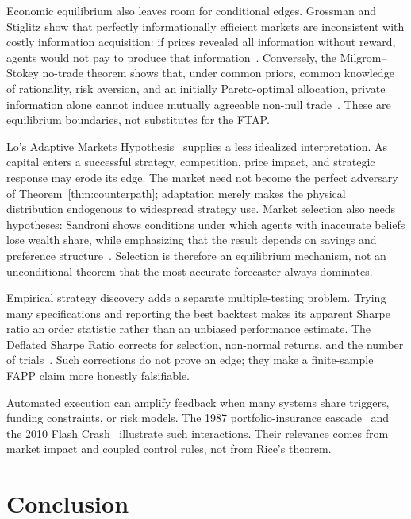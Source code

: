 \documentclass[aps,pra,reprint,superscriptaddress,amsmath,amssymb,floatfix]{revtex4-2}
\theoremstyle{plain}
\theoremstyle{definition}
\theoremstyle{remark}
\begin{document}
Economic equilibrium also leaves room for conditional edges. Grossman and
Stiglitz show that perfectly informationally efficient markets are
inconsistent with costly information acquisition: if prices revealed all
information without reward, agents would not pay to produce that
information~\cite{GrossmanStiglitz1980}. Conversely, the Milgrom--Stokey
no-trade theorem shows that, under common priors, common knowledge of
rationality, risk aversion, and an initially Pareto-optimal allocation, private
information alone cannot induce mutually agreeable non-null
trade~\cite{MilgromStokey1982}. These are equilibrium boundaries, not
substitutes for the FTAP.

Lo's Adaptive Markets Hypothesis~\cite{Lo2004} supplies a less idealized
interpretation. As capital enters a successful strategy, competition, price
impact, and strategic response may erode its edge. The market need not become
the perfect adversary of Theorem~\ref{thm:counterpath}; adaptation merely makes
the physical distribution endogenous to widespread strategy use. Market
selection also needs hypotheses: Sandroni shows conditions under which agents
with inaccurate beliefs lose wealth share, while emphasizing that the result
depends on savings and preference structure~\cite{Sandroni2000}. Selection is
therefore an equilibrium mechanism, not an unconditional theorem that the most
accurate forecaster always dominates.

Empirical strategy discovery adds a separate multiple-testing problem. Trying
many specifications and reporting the best backtest makes its apparent Sharpe
ratio an order statistic rather than an unbiased performance estimate. The
Deflated Sharpe Ratio corrects for selection, non-normal returns, and the
number of trials~\cite{BaileyLopez2014}. Such corrections do not prove an edge;
they make a finite-sample FAPP claim more honestly falsifiable.

Automated execution can amplify feedback when many systems share triggers,
funding constraints, or risk models. The 1987 portfolio-insurance
cascade~\cite{Brady1988} and the 2010 Flash Crash~\cite{Kirilenko2017} illustrate
such interactions. Their relevance comes from market impact and coupled
control rules, not from Rice's theorem.

\section{Conclusion}
\label{sec:conclusion}
\end{document}
